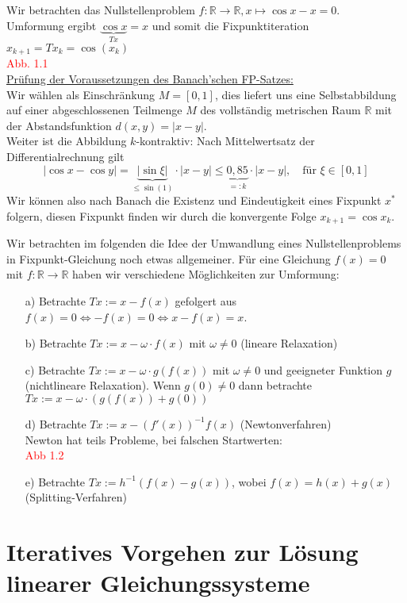 \documentclass{article}
\begin{document}
\begin{egbox} 
    Wir betrachten das Nullstellenproblem $f:\mathbb{R}\rightarrow\mathbb{R}, x\mapsto \cos x - x = 0$. \\
    Umformung ergibt $\underbrace{\cos x}_{Tx} = x$ und somit die Fixpunktiteration $x_{k+1}=Tx_k=\cos(x_k)$ \\
    \textcolor{red}{Abb. 1.1} \\
    \underline{Prüfung der Voraussetzungen des Banach'schen FP-Satzes:} \\
    Wir wählen als Einschränkung $M=[0,1]$, dies liefert uns eine Selbstabbildung auf einer abgeschlossenen Teilmenge $M$ des vollständig metrischen Raum $\mathbb{R}$ mit der Abstandsfunktion $ d(x,y) = |x-y|$. \\
    Weiter ist die Abbildung $k$-kontraktiv:  Nach Mittelwertsatz der Differentialrechnung gilt 
    \[|\cos x - \cos y| = \underbrace{|\sin \xi|}_{\leq \sin(1)}\cdot|x-y|\leq \underbrace{0,85}_{=:k}\cdot |x-y|, \quad \text{für } \xi\in[0,1]\]
    Wir können also nach Banach die Existenz und Eindeutigkeit eines Fixpunkt $x^*$ folgern, diesen Fixpunkt finden wir durch die konvergente Folge $x_{k+1}=\cos x_k$. 
\end{egbox}
Wir betrachten im folgenden die Idee der Umwandlung eines Nullstellenproblems in Fixpunkt-Gleichung noch etwas allgemeiner. Für eine Gleichung $f(x)=0$ mit $f:\mathbb{R}\rightarrow\mathbb{R}$ haben wir verschiedene Möglichkeiten zur Umformung:\\
\begin{enumerate}
    \item[a)] Betrachte $Tx := x-f(x)$ gefolgert aus $f(x)=0\Leftrightarrow -f(x)=0 \Leftrightarrow x-f(x)=x$.
    \item[b)] Betrachte $Tx := x-\omega \cdot f(x)$ mit $\omega\neq 0$ (lineare Relaxation)
    \item[c)] Betrachte $Tx:=x-\omega \cdot g(f(x))$ mit $\omega \neq 0$ und geeigneter Funktion $g$ (nichtlineare Relaxation). Wenn $g(0)\neq 0$ dann betrachte $Tx:=x-\omega\cdot(g(f(x))+g(0))$
    \item[d)] Betrachte $Tx:=x-(f'(x))^{-1} f(x)$ (Newtonverfahren) \\
    Newton hat teils Probleme, bei falschen Startwerten: \\
    \textcolor{red}{Abb 1.2}
    \item[e)] Betrachte $Tx:=h^{-1}(f(x)-g(x))$, wobei $f(x)=h(x)+g(x)$ (Splitting-Verfahren) 
\end{enumerate}
\section{Iteratives Vorgehen zur Lösung linearer Gleichungssysteme}
\end{document}
